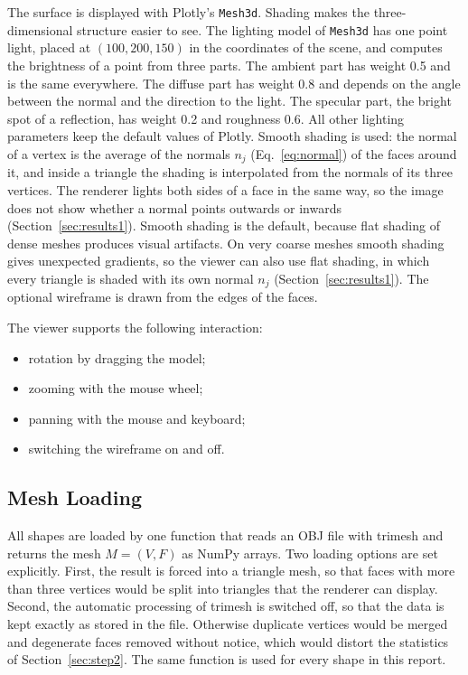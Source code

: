 \documentclass[10pt,a4paper]{article}
\begin{document}
The surface is displayed with Plotly's \texttt{Mesh3d}. Shading makes the three-dimensional structure easier to see. The
lighting model of \texttt{Mesh3d} has one point light, placed at $(100,200,150)$ in the coordinates of the scene, and computes
the brightness of a point from three parts. The ambient part has weight 0.5 and is the same everywhere. The diffuse part has
weight 0.8 and depends on the angle between the normal and the direction to the light. The specular part, the bright spot of a
reflection, has weight 0.2 and roughness 0.6. All other lighting parameters keep the default values of Plotly. Smooth shading is used: the normal of a
vertex is the average of the normals $n_j$ (Eq.~\eqref{eq:normal}) of the faces around it, and inside a triangle the shading is
interpolated from the normals of its three vertices. The renderer lights both sides of a face in the same way, so the image does
not show whether a normal points outwards or inwards (Section~\ref{sec:results1}). Smooth shading is the default, because flat shading
of dense meshes produces visual artifacts. On very coarse meshes smooth shading gives unexpected gradients, so the viewer can
also use flat shading, in which every triangle is shaded with its own normal $n_j$ (Section~\ref{sec:results1}). The optional wireframe is drawn from the edges of the faces.

The viewer supports the following interaction:
\begin{itemize}
  \item rotation by dragging the model;
  \item zooming with the mouse wheel;
  \item panning with the mouse and keyboard;
  \item switching the wireframe on and off.
\end{itemize}

\subsection{Mesh Loading}\label{sec:loading}
All shapes are loaded by one function that reads an OBJ file with trimesh and returns the mesh $M=(V,F)$ as NumPy arrays.
Two loading options are set explicitly. First, the result is forced into a triangle mesh, so that faces with more than three
vertices would be split into triangles that the renderer can display. Second, the automatic processing of trimesh is switched
off, so that the data is kept exactly as stored in the file. Otherwise duplicate vertices would be merged and degenerate faces
removed without notice, which would distort the statistics of Section~\ref{sec:step2}. The same function is used for every
shape in this report.
\end{document}
